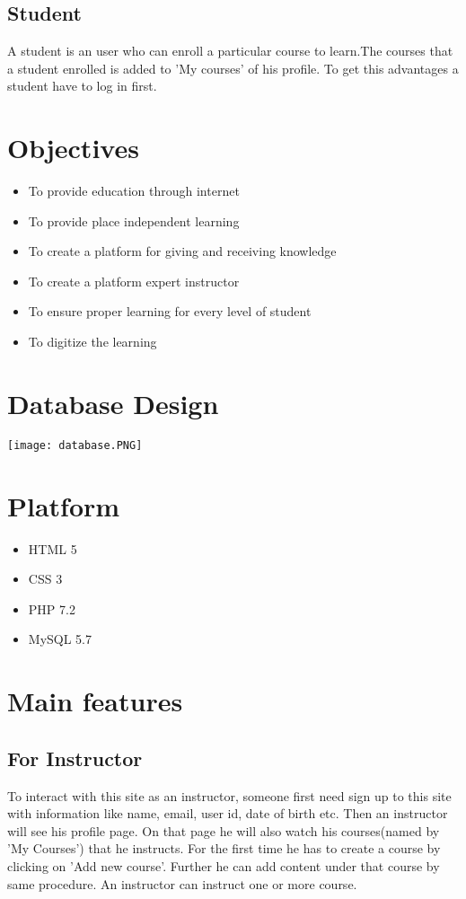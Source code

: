 \documentclass[12pt]{article}
\begin{document}
\subsection{Student}
\par A student is an user who can enroll a particular course to learn.The courses that a student enrolled is added to 'My courses' of his profile. To get this advantages a student have to log in first.  
%
%
\section{Objectives}
\begin{itemize}
    \setlength{\itemsep}{1pt}
    \setlength{\parskip}{0pt}
    \setlength{\parsep}{0pt}
    \item To provide education through internet
    \item To provide place independent learning
    \item  To create a platform for giving and receiving knowledge
    \item To create a platform expert instructor
    \item To ensure proper learning for every level of student
    \item To digitize the learning 
\end{itemize}
%
 
\section{Database Design}
\texttt{[image: database.PNG]}
\section{Platform}
\begin{itemize}
    \setlength{\itemsep}{1pt}
    \setlength{\parskip}{0pt}
    \setlength{\parsep}{0pt}
    \item HTML 5
    \item CSS 3
    \item PHP 7.2
    \item MySQL 5.7 
 
\end{itemize}
%
%
\section{Main features}
%
\subsection{For Instructor}
\par To interact with this site as an instructor, someone first need sign up to this site with information like name, email, user id, date of birth etc. Then an instructor will see his profile page. On that page he will also watch his courses(named by 'My Courses') that he instructs. For the first time he has to create a course by clicking on 'Add new course'. Further he can add content under that course by same procedure. An instructor can instruct one or more course.
%
\end{document}
